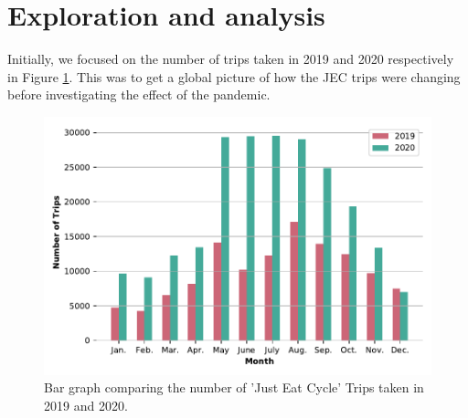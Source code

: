 \documentclass[11pt,a4paper]{article}
\begin{document}
\section{Exploration and  analysis} \label{exploration}
Initially, we focused on the number of trips taken in 2019 and 2020 respectively in Figure \ref{fds-project:fig:numberOfTrips}. This was to get a global picture of how the JEC trips were changing before investigating the effect of the pandemic. 

\begin{figure}[ht]
  \includegraphics{number_trips.pdf}
  \caption{Bar graph comparing the number of 'Just Eat Cycle' Trips taken in 2019 and 2020.}
  \label{fds-project:fig:numberOfTrips}
\end{figure}
\end{document}
